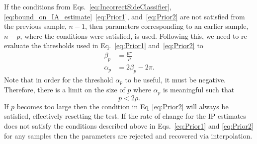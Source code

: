 \documentclass[a4paper]{IEEEtran}
\begin{document}
If the conditions from Eqs.~\ref{eq:IncorrectSideClassifier}, \ref{eq:bound_on_IA_estimate}~\ref{eq:Prior1}, and~\ref{eq:Prior2} are not satisfied from the previous sample, $n-1$, then parameters corresponding to an earlier sample, $n-p$, where the conditions were satisfied, is used. Following this, we need to re-evaluate the thresholds used in Eq.~\ref{eq:Prior1} and~\ref{eq:Prior2} to
\begin{align}
	\beta_p &= \frac{p\pi}{\rho} \\
	\alpha_p &=2\beta_p-2\pi.
\end{align}
Note that in order for the threshold $\alpha_p$ to be useful, it must be negative. Therefore, there is a limit on the size of $p$ where $\alpha_p$ is meaningful such that
\begin{equation}
	p < 2\rho.
\end{equation}
If $p$ becomes too large then the condition in Eq~\ref{eq:Prior2} will always be satisfied, effectively resetting the test. If the rate of change for the IP estimates does not satisfy the conditions described above in Eqs.~\ref{eq:Prior1} and \ref{eq:Prior2} for any samples then the parameters are rejected and recovered via interpolation.
\end{document}
